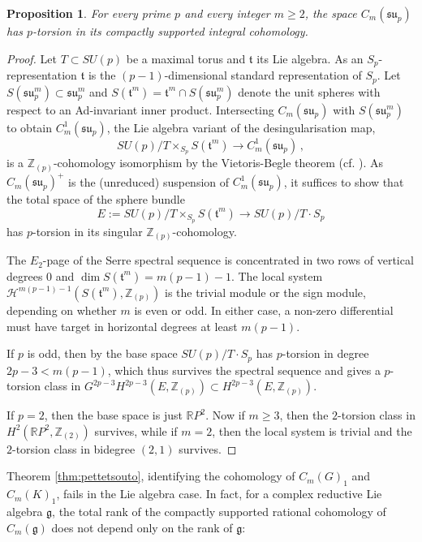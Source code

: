 \documentclass[oneside, 12pt, a4paper]{amsart}
\numberwithin{equation}{section}
\newcommand{\R}{\mathbb{R}}
\newcommand{\Z}{\mathbb{Z}}
\theoremstyle{plain}
\newtheorem{proposition}[theorem]{Proposition}
\theoremstyle{definition}
\theoremstyle{remark}
\begin{document}
\begin{proposition}
    For every prime $p$ and every integer $m\geq 2$, the space $C_m(\mathfrak{su}_p)$ has $p$-torsion in its compactly supported integral cohomology.
\end{proposition}
\begin{proof}
    Let $T\subset SU(p)$ be a maximal torus and $\mathfrak{t}$ its Lie algebra. As an $S_p$-representation $\mathfrak{t}$ is the $(p-1)$-dimensional standard representation of $S_p$. Let $S(\mathfrak{su}_p^m)\subset \mathfrak{su}_p^m$ and $S(\mathfrak{t}^m)= \mathfrak{t}^m\cap S(\mathfrak{su}_p^m)$ denote the unit spheres with respect to an Ad-invariant inner product. Intersecting $C_m(\mathfrak{su}_p)$ with $S(\mathfrak{su}_p^m)$ to obtain $C_m^1(\mathfrak{su}_p)$, the Lie algebra variant of the desingularisation map, \[SU(p)/T\times_{S_p} S(\mathfrak{t}^m)\to C_m^1(\mathfrak{su}_p)\,,\] is a $\Z_{(p)}$-cohomology isomorphism by the Vietoris-Begle theorem (cf. \cite[Lemma A.13]{AGG}).
    As $C_m(\mathfrak{su}_p)^+$ is the (unreduced) suspension of $C^1_m(\mathfrak{su}_p)$, it suffices to show that the total space of the sphere bundle
    \[
    E:=SU(p)/T\times_{S_p} S(\mathfrak{t}^m) \to SU(p)/T\cdot S_p
    \]
    has $p$-torsion in its singular $\Z_{(p)}$-cohomology.
    
    The $E_2$-page of the Serre spectral sequence is concentrated in two rows of vertical degrees $0$ and $\dim S(\mathfrak{t}^m)=m(p-1)-1$. The local system $\mathcal{H}^{m(p-1)-1}(S(\mathfrak{t}^m),\Z_{(p)})$ is the trivial module or the sign module, depending on whether $m$ is even or odd. In either case, a non-zero differential must have target in horizontal degrees at least $m(p-1)$. 
    
    If $p$ is odd, then by \cite[Corollary 6.9]{GuerraJanna} the base space $SU(p)/T\cdot S_p$ has $p$-torsion in degree $2p-3< m(p-1)$, which thus survives the spectral sequence and gives a $p$-torsion class in $G^{2p-3}H^{2p-3}(E,\Z_{(p)})\subset H^{2p-3}(E,\Z_{(p)})$.
    
    If $p=2$, then the base space is just $\R P^2$. Now if $m\geq 3$, then the $2$-torsion class in $H^2(\R P^2,\Z_{(2)})$ survives, while if $m=2$, then the local system is trivial and the $2$-torsion class in bidegree $(2,1)$ survives. 
\end{proof}
Theorem \ref{thm:pettetsouto}, identifying the cohomology of $C_m(G)_1$ and $C_m(K)_1$, fails in the Lie algebra case. In fact, for a complex reductive Lie algebra $\mathfrak{g}$, the total rank of the compactly supported rational cohomology of $C_m(\mathfrak{g})$ does not depend only on the rank of $\mathfrak{g}$:
\end{document}
